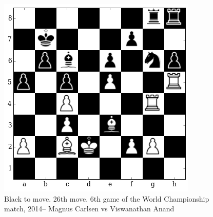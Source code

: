 \begin{figure}[H]
\hspace*{-0.5in}  
  \centering
  \includegraphics[scale=0.65]{img/best_moves/vishy-magnus.png}
  \caption[Middle game case study]{Black to move. 26th move. 6th game of 
the World Championship match, 2014-- Magnus Carlsen vs Viswanathan Anand}

\label{figure:carlsen-vs-vishy}
\end{figure}

